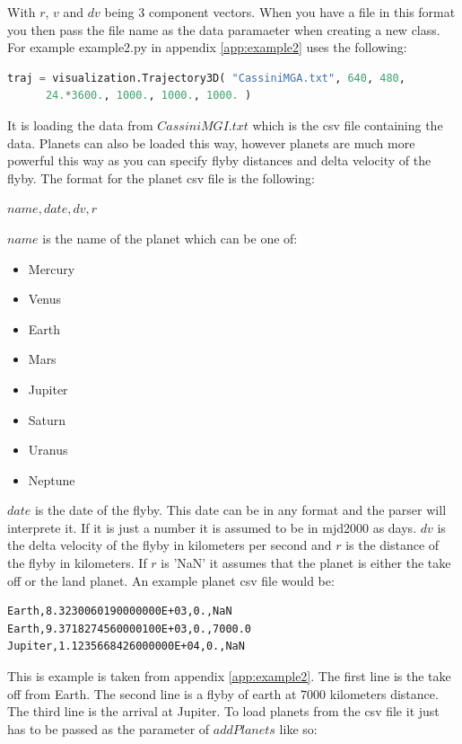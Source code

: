 \documentclass[a4paper,11pt]{article}
\begin{document}
With $r$, $v$ and $dv$ being 3 component vectors. When you have a file in this format you then pass the file name as the data paramaeter when creating a new class. For example example2.py in appendix \ref{app:example2} uses the following:

\begin{lstlisting}[language=Python]
traj = visualization.Trajectory3D( "CassiniMGA.txt", 640, 480,
      24.*3600., 1000., 1000., 1000. )
\end{lstlisting}

It is loading the data from $CassiniMGI.txt$ which is the \gls{csv} file containing the data. Planets can also be loaded this way, however planets are much more powerful this way as you can specify flyby distances and delta velocity of the flyby. The format for the planet \gls{csv} file is the following:

$ name, date, dv, r $

$name$ is the name of the planet which can be one of:

\begin{itemize}
\item Mercury
\item Venus
\item Earth
\item Mars
\item Jupiter
\item Saturn
\item Uranus
\item Neptune
\end{itemize}

$date$ is the date of the flyby. This date can be in any format and the parser will interprete it. If it is just a number it is assumed to be in \gls{mjd2000} as days. $dv$ is the delta velocity of the flyby in kilometers per second and $r$ is the distance of the flyby in kilometers. If $r$ is 'NaN' it assumes that the planet is either the take off or the land planet. An example planet \gls{csv} file would be:

\begin{lstlisting}
Earth,8.3230060190000000E+03,0.,NaN
Earth,9.3718274560000100E+03,0.,7000.0
Jupiter,1.1235668426000000E+04,0.,NaN
\end{lstlisting}

This is example is taken from appendix \ref{app:example2}. The first line is the take off from Earth. The second line is a flyby of earth at 7000 kilometers distance. The third line is the arrival at Jupiter. To load planets from the \gls{csv} file it just has to be passed as the parameter of $addPlanets$ like so:
\end{document}
